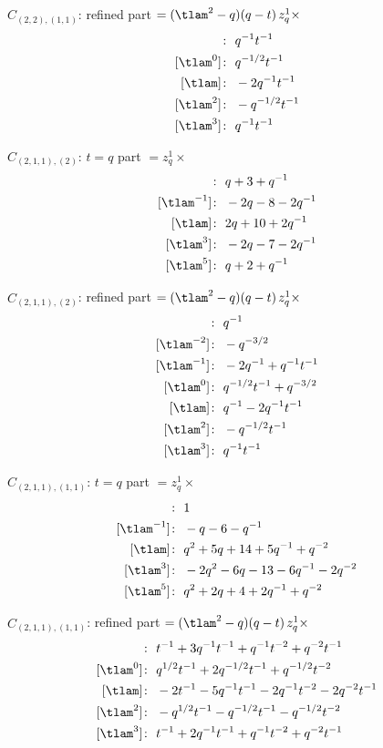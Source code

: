 $\hat C_{(2,2),(1,1)}$: refined part $= (\tlam^2 - q)(q - t)\, z_q^{1} \times$
\begin{align*}
[\tlam^{-1}]\colon\ & q^{-1} t^{-1} \\
[\tlam^{0}]\colon\ & q^{-1/2} t^{-1} \\
[\tlam]\colon\ & -2 q^{-1} t^{-1} \\
[\tlam^{2}]\colon\ & -q^{-1/2} t^{-1} \\
[\tlam^{3}]\colon\ & q^{-1} t^{-1}
\end{align*}

$\hat C_{(2,1,1),(2)}$: $t = q$ part $= z_q^{1} \times$
\begin{align*}
[\tlam^{-3}]\colon\ & q +3 +q^{-1} \\
[\tlam^{-1}]\colon\ & -2 q -8 -2 q^{-1} \\
[\tlam]\colon\ & 2 q +10 +2 q^{-1} \\
[\tlam^{3}]\colon\ & -2 q -7 -2 q^{-1} \\
[\tlam^{5}]\colon\ & q +2 +q^{-1}
\end{align*}

$\hat C_{(2,1,1),(2)}$: refined part $= (\tlam^2 - q)(q - t)\, z_q^{1} \times$
\begin{align*}
[\tlam^{-3}]\colon\ & q^{-1} \\
[\tlam^{-2}]\colon\ & -q^{-3/2} \\
[\tlam^{-1}]\colon\ & -2 q^{-1} +q^{-1} t^{-1} \\
[\tlam^{0}]\colon\ & q^{-1/2} t^{-1} +q^{-3/2} \\
[\tlam]\colon\ & q^{-1} -2 q^{-1} t^{-1} \\
[\tlam^{2}]\colon\ & -q^{-1/2} t^{-1} \\
[\tlam^{3}]\colon\ & q^{-1} t^{-1}
\end{align*}

$\hat C_{(2,1,1),(1,1)}$: $t = q$ part $= z_q^{1} \times$
\begin{align*}
[\tlam^{-3}]\colon\ & 1 \\
[\tlam^{-1}]\colon\ & -q -6 -q^{-1} \\
[\tlam]\colon\ & q^{2} +5 q +14 +5 q^{-1} +q^{-2} \\
[\tlam^{3}]\colon\ & -2 q^{2} -6 q -13 -6 q^{-1} -2 q^{-2} \\
[\tlam^{5}]\colon\ & q^{2} +2 q +4 +2 q^{-1} +q^{-2}
\end{align*}

$\hat C_{(2,1,1),(1,1)}$: refined part $= (\tlam^2 - q)(q - t)\, z_q^{1} \times$
\begin{align*}
[\tlam^{-1}]\colon\ & t^{-1} +3 q^{-1} t^{-1} +q^{-1} t^{-2} +q^{-2} t^{-1} \\
[\tlam^{0}]\colon\ & q^{1/2} t^{-1} +2 q^{-1/2} t^{-1} +q^{-1/2} t^{-2} \\
[\tlam]\colon\ & -2 t^{-1} -5 q^{-1} t^{-1} -2 q^{-1} t^{-2} -2 q^{-2} t^{-1} \\
[\tlam^{2}]\colon\ & -q^{1/2} t^{-1} -q^{-1/2} t^{-1} -q^{-1/2} t^{-2} \\
[\tlam^{3}]\colon\ & t^{-1} +2 q^{-1} t^{-1} +q^{-1} t^{-2} +q^{-2} t^{-1}
\end{align*}

